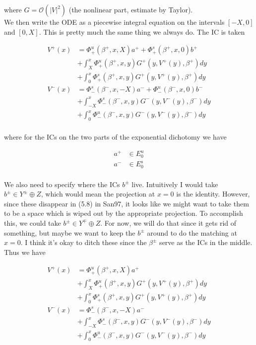 \documentclass[12pt]{article}
\begin{document}
where $G = \mathcal{O}(|V|^2)$ (the nonlinear part, estimate by Taylor).\\

We then write the ODE as a piecewise integral equation on the intervals $[-X, 0]$ and $[0, X]$. This is pretty much the same thing we always do. The IC is taken 

\begin{align*}
V^+(x) &= \Phi^u_+(\beta^+, x, X) a^+ + \Phi^s_+(\beta^+, x, 0) b^+ \\
&+ \int_{X}^x \Phi_+^u(\beta^+, x, y) G^+(y, V^+(y),\beta^+)dy \\
&+ \int_0^x \Phi_+^s(\beta^+, x, y) G^+(y, V^+(y),\beta^+)dy \\ 
V^-(x) &= \Phi^s_-(\beta^-, x, -X) a^- + \Phi^u_-(\beta^-, x, 0) b^- \\
&+ \int_{-X}^x \Phi_-^s(\beta^-, x, y) G^-(y, V^-(y),\beta^-)dy \\
&+ \int_0^x \Phi_-^u(\beta^-, x, y) G^-(y, V^-(y),\beta^-)dy \\
\end{align*}

where for the ICs on the two parts of the exponential dichotomy we have

\begin{align*}
a^+ &\in E_0^u \\
a^- &\in E_0^s \\
\end{align*}

We also need to specify where the ICs $b^\pm$ live. Intuitively I would take $b^\pm \in Y^\pm \oplus Z$, which would mean the projection at $x = 0$ is the identity. However, since these disappear in (5.8) in San97, it looks like we might want to take them to be a space which is wiped out by the appropriate projection. To accomplish this, we could take $b^\pm \in Y^\mp \oplus Z$. For now, we will do that since it gets rid of something, but maybe we want to keep the $b^\pm$ around to do the matching at $x = 0$. I think it's okay to ditch these since the $\beta^\pm$ serve as the ICs in the middle. \\

Thus we have

\begin{align*}
V^+(x) &= \Phi^u_+(\beta^+, x, X) a^+  \\
&+ \int_{X}^x \Phi_+^u(\beta^+, x, y) G^+(y, V^+(y),\beta^+)dy \\
&+ \int_0^x \Phi_+^s(\beta^+, x, y) G^+(y, V^+(y),\beta^+)dy \\ 
V^-(x) &= \Phi^s_-(\beta^-, x, -X) a^-  \\
&+ \int_{-X}^x \Phi_-^s(\beta^-, x, y) G^-(y, V^-(y),\beta^-)dy \\
&+ \int_0^x \Phi_-^u(\beta^-, x, y) G^-(y, V^-(y),\beta^-)dy \\
\end{align*}
\end{document}
